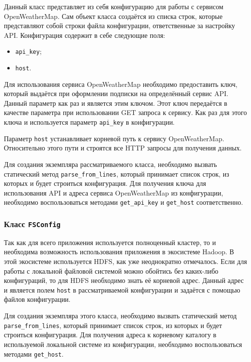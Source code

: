 Данный класс представляет из себя конфигурацию для работы с сервисом OpenWeatherMap.
Сам объект класса создаётся из списка строк, которые представляют собой строки файла конфигурации, ответственные за настройку API.
Конфигурация содержит в себе следующие поля:
\begin{itemize}
    \item \texttt{api\_key};
    \item \texttt{host}.
\end{itemize}

Для использования сервиса OpenWeatherMap необходимо предоставить ключ, который выдаётся при оформлении подписки на определённый сервис API.
Данный параметр как раз и является этим ключом.
Этот ключ передаётся в качестве параметра при использовании GET запроса к сервису.
Как раз для этого ключа и используется параметр \texttt{api\_key} в конфигурации.

Параметр \texttt{host} устанавливает корневой путь к сервису OpenWeatherMap.
Относительно этого пути и строятся все HTTP запросы для получения данных.

Для создания экземпляра рассматриваемого класса, необходимо вызвать статический метод \texttt{parse\_from\_lines}, который принимает список строк, из которых и будет строиться конфигурация.
Для получения ключа для использования API и адреса сервиса OpenWeatherMap из конфигурации, необходимо воспользоваться методами \texttt{get\_api\_key} и \texttt{get\_host} соответственно.

\subsubsection{Класс \texttt{FSConfig}}

Так как для всего приложения используется полноценный кластер, то и необходима возможность использования приложения в экосистеме Hadoop.
В этой экосистеме используется HDFS, как уже неоднократно отмечалось.
Если для работы с локальной файловой системой можно обойтись без каких-либо конфигураций, то для HDFS необходимо знать её корневой адрес.
Данный адрес и является полем \texttt{host} в рассматриваемой конфигурации и задаётся с помощью файлов конфигурации.

Для создания экземпляра этого класса, необходимо вызвать статический метод \texttt{parse\_from\_lines}, который принимает список строк, из которых и будет строиться конфигурация.
Для получения адреса к корневому каталогу в используемой локальной системе из конфигурации, необходимо воспользоваться методами \texttt{get\_host}.

